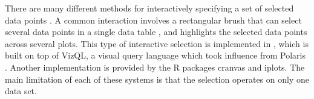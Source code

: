 \documentclass[journal]{vgtc}\usepackage[]{graphicx}\usepackage[]{color}
\begin{document}
There are many different methods for interactively specifying a set of
selected data points \citep{scented-widgets, heer2008generalized}. A
common interaction involves a rectangular brush that can select
several data points in a single data table \citep{cleveland,
  brushing-scatterplots}, and highlights the selected data points
across several plots.
This type of interactive selection is implemented in
\citet{tableau}, which is built on top of VizQL, a visual query
language which took influence from Polaris \citep{polaris}.
Another implementation is provided by the R packages cranvas and
iplots. The main limitation of each of these systems is that the
selection operates on only one data set.



\end{document}
